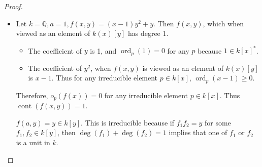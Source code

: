 \documentclass[12pt, psamsfonts]{amsart}
\theoremstyle{definition}
\theoremstyle{remark}
\DeclareMathOperator{\ord}{ord}
\DeclareMathOperator{\cont}{cont}
\numberwithin{equation}{section}
\begin{document}
\begin{proof}
\begin{itemize}
    \item
      Let $k = \mathbb{Q}, a = 1, f(x, y) = (x - 1)y^2 + y$.
      Then $f(x, y)$, which when viewed as an element of $k(x)[y]$ has degree 1.
      \begin{itemize}
        \item
          The coefficient of $y$ is 1, and $\ord_p(1) = 0$ for any $p$ because $1 \in k[x]^*$.
        \item
          The coefficient of $y^2$, when $f(x, y)$ is viewed as an element of $k(x)[y]$ is $x - 1$.
          Thus for any irreducible element $p \in k[x]$, $\ord_p(x - 1) \geq 0$.
      \end{itemize}
      Therefore, $o_p(f(x)) = 0$ for any irreducible element $p \in k[x]$.
      Thus $\cont(f(x, y)) = 1$.
      
      $f(a, y) = y \in k[y]$.
      This is irreducible because if $f_1f_2 = y$ for some $f_1, f_2 \in k[y]$, then $\deg(f_1) + \deg(f_2) = 1$ implies that one of $f_1$ or $f_2$ is a unit in $k$.
  \end{itemize}
\end{proof}
\end{document}
